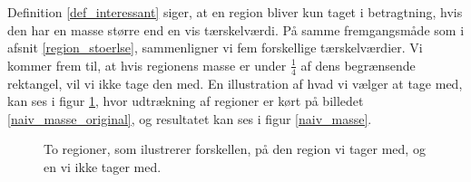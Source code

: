 Definition \ref{def_interessant} siger, at en region bliver kun taget i
betragtning, hvis den har en masse større end en vis tærskelværdi.
På samme fremgangsmåde som i afsnit \ref{region_stoerlse}, sammenligner vi fem
forskellige tærskelværdier. Vi kommer frem til, at hvis regionens masse er
under $\frac{1}{4}$ af dens begrænsende rektangel, vil vi ikke tage den med. En
illustration af hvad vi vælger at tage med, kan ses i figur \ref{masse}, hvor
udtrækning af regioner er kørt på billedet \ref{naiv_masse_original}, og
resultatet kan ses i figur \ref{naiv_masse}.

\begin{figure}[!h]
    \centering
    \hspace{1em}
    \label{masse}
    \caption{To regioner, som ilustrerer forskellen, på den region vi tager med, og en vi ikke tager med.}
\end{figure}
